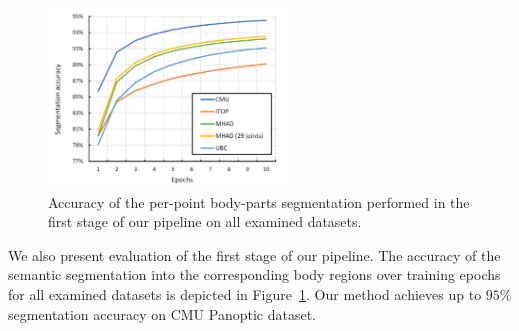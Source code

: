 \begin{figure}[H]
\begin{center}
\centering
\includegraphics[height=180px]{images/results/segmentation_acc.png}
\caption[Accuracy of the body-parts segmentation of our method.]{Accuracy of the per-point body-parts segmentation performed in the first stage of our pipeline on all examined datasets.}
\label{fig:seg_acc}
\end{center}
\end{figure}

\noindent
We also present evaluation of the first stage of our pipeline. The accuracy of the semantic segmentation into the corresponding body regions over training epochs for all examined datasets is depicted in Figure~\ref{fig:seg_acc}. Our method achieves up to $95\%$ segmentation accuracy on CMU Panoptic dataset.\par
\vspace{5mm}
